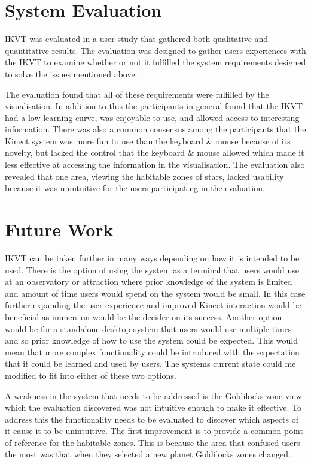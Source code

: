 \section{System Evaluation}
IKVT was evaluated in a user study that gathered both qualitative and
quantitative
results. The evaluation was designed to gather users experiences with the IKVT
to examine whether or not it fulfilled the system requirements designed to solve
the issues mentioned above.

The evaluation found that all of these requirements were fulfilled by the
visualisation. In addition to this the participants in general found that the
IKVT had a low learning curve, was enjoyable to use, and allowed
access to interesting information. There was also a common consensus among the
participants that the Kinect system was more fun to use than the keyboard \&
mouse because of its novelty, but lacked the control that the
keyboard \& mouse allowed which made it less effective at accessing the
information in the visualisation. The evaluation also revealed that one area,
viewing the habitable zones of stars, lacked
usability because it was unintuitive for the users participating in the
evaluation.     
\section{Future Work}
IKVT  can be taken further in many ways depending
on how it is intended to be used. There is the option of using the system as a
terminal that users would use at an observatory or attraction where prior
knowledge of the system is limited and amount of time users would spend on the
system would be small. In this case further expanding the user experience and
improved Kinect interaction would be beneficial as immersion would be the
decider on its success. Another option would be for a standalone
desktop system that users would use multiple times and so prior knowledge of how
to use the system could be expected. This would mean that more complex
functionality could be introduced with the expectation that it could be learned
and used by
users. The systems current state could me modified to fit into either of these
two options.

A weakness in the system that needs to be addressed is the Goldilocks zone view
which the evaluation discovered was not intuitive enough to make it effective.
To
address this the functionality needs to be evaluated to discover which aspects
of it cause it to be unintuitive. The first improvement is to provide a common
point of reference for the habitable zones. This is because the area that
confused users the most was that when they selected a new planet Goldilocks
zones changed. 

